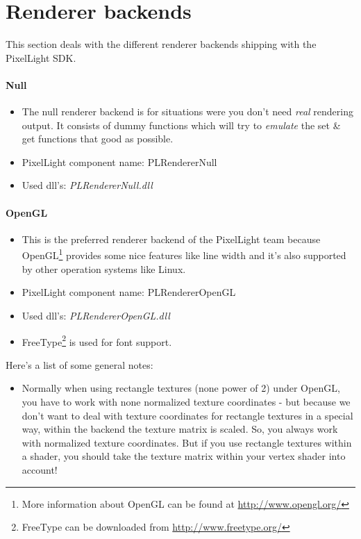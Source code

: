 \section{Renderer backends}
This section deals with the different renderer backends shipping with the PixelLight SDK.


\paragraph{Null}
\begin{itemize}
\item The null renderer backend is for situations were you don't need \emph{real} rendering output. It consists of dummy functions which will try to \emph{emulate} the set \& get functions that good as possible.
\item PixelLight component name: PLRendererNull
\item Used dll's: \emph{PLRendererNull.dll}
\end{itemize}


\paragraph{OpenGL}
\begin{itemize}
\item This is the preferred renderer backend of the PixelLight team because OpenGL\footnote{More information about OpenGL can be found at \url{http://www.opengl.org/}} provides some nice features like line width and it's also supported by other operation systems like Linux.
\item PixelLight component name: PLRendererOpenGL
\item Used dll's: \emph{PLRendererOpenGL.dll}
\item FreeType\footnote{FreeType can be downloaded from \url{http://www.freetype.org/}} is used for font support.
\end{itemize}

Here's a list of some general notes:
\begin{itemize}
\item Normally when using rectangle textures (none power of 2) under OpenGL, you have to work with none normalized texture coordinates - but because we don't want to deal with texture coordinates for rectangle textures in a special way, within the backend the texture matrix is scaled. So, you always work with normalized texture coordinates. But if you use rectangle textures within a shader, you should take the texture matrix within your vertex shader into account!
\end{itemize}

